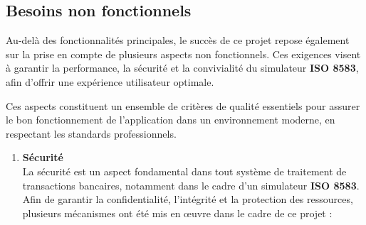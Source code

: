 \subsection{Besoins non fonctionnels}

Au-delà des fonctionnalités principales, le succès de ce projet repose également sur la prise en compte de plusieurs aspects non fonctionnels. Ces exigences visent à garantir la performance, la sécurité et la convivialité du simulateur \textbf{ISO 8583}, afin d'offrir une expérience utilisateur optimale.

Ces aspects constituent un ensemble de critères de qualité essentiels pour assurer le bon fonctionnement de l'application dans un environnement moderne, en respectant les standards professionnels.


\begin{enumerate}[label=\textbf{\alph*.}]
    \item \textbf{Sécurité} \\
    La sécurité est un aspect fondamental dans tout système de traitement de transactions bancaires, notamment dans le cadre d’un simulateur \textbf{ISO 8583}. Afin de garantir la confidentialité, l'intégrité et la protection des ressources, plusieurs mécanismes ont été mis en œuvre dans le cadre de ce projet :
 

\end{enumerate}
